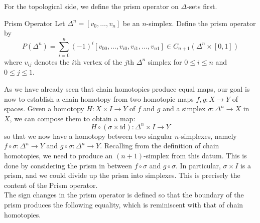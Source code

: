 \documentclass[a4paper]{article}
\begin{document}
For the topological side, we define the prism operator on $\Delta$-sets first. 

\begin{defn}{Prism Operator}{} Let $\Delta^n=[v_0,\dots,v_n]$ be an $n$-simplex. Define the prism operator by $$P(\Delta^n)=\sum_{i=0}^n(-1)^i[v_{00},\dots,v_{i0},v_{i1},\dots,v_{n1}]\in C_{n+1}(\Delta^n\times[0,1])$$ where $v_{ij}$ denotes the $i$th vertex of the $j$th $\Delta^n$ simplex for $0\leq i\leq n$ and $0\leq j\leq 1$. 
\end{defn}

As we have already seen that chain homotopies produce equal maps, our goal is now to establish a chain homotopy from two homotopic maps $f,g:X\to Y$ of spaces. Given a homotopy $H:X\times I\to Y$ of $f$ and $g$ and a simplex $\sigma:\Delta^n\to X$ in $X$, we can compose them to obtain a map: $$H\circ(\sigma\times\text{id}):\Delta^n\times I\to Y$$ so that we now have a homotopy between two singular $n$-simplexes, namely $f\circ\sigma:\Delta^n\to Y$ and $g\circ\sigma:\Delta^n\to Y$. Recalling from the definition of chain homotopies, we need to produce an $(n+1)$-simplex from this datum. This is done by considering the prism in between $f\circ\sigma$ and $g\circ\sigma$. In particular, $\sigma\times I$ is a prism, and we could divide up the prism into simplexes. This is precisely the content of the Prism operator. \\

The sign changes in the prism operator is defined so that the boundary of the prism produces the following equality, which is reminiscent with that of chain homotopies. 
\end{document}
